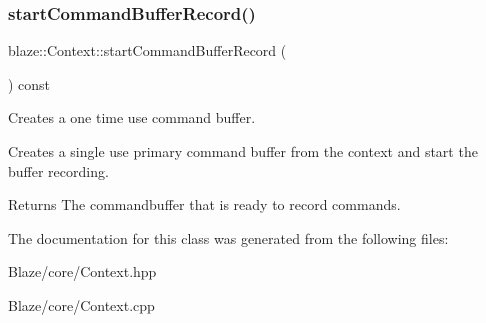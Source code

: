 \subsubsection{\texorpdfstring{start\+Command\+Buffer\+Record()}{startCommandBufferRecord()}}
{\footnotesize\ttfamily blaze\+::\+Context\+::start\+Command\+Buffer\+Record (\begin{DoxyParamCaption}{ }\end{DoxyParamCaption}) const}



Creates a one time use command buffer. 

Creates a single use primary command buffer from the context and start the buffer recording.

\begin{DoxyReturn}{Returns}
The commandbuffer that is ready to record commands. 
\end{DoxyReturn}


The documentation for this class was generated from the following files\+:\begin{DoxyCompactItemize}
\item 
Blaze/core/Context.\+hpp\item 
Blaze/core/Context.\+cpp\end{DoxyCompactItemize}
